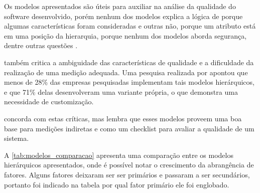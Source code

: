 \documentclass[
	12pt,				%
	openright,			%
	oneside,			%
	a4paper,			%
	english,			%
	brazil,				%
	]{abntex2}
\begin{document}
Os modelos apresentados são úteis para auxiliar na análise da qualidade do software desenvolvido, porém nenhum dos modelos explica a lógica de porque algumas características foram consideradas e outras não, porque um atributo está em uma posição da hierarquia, porque nenhum dos modelos aborda segurança, dentre outras questões \cite{PFLEEGER2010}.

 também critica a ambiguidade das características de qualidade e a dificuldade da realização de uma medição adequada. Uma pesquisa realizada por  apontou que menos de 28\% das empresas pesquisadas implementam tais modelos hierárquicos, e que 71\% delas desenvolveram uma variante própria, o que demonstra uma necessidade de customização.

 concorda com estas críticas, mas lembra que esses modelos proveem uma boa base para medições indiretas e como um checklist para avaliar a qualidade de um sistema.

A \autoref{tab:modelos_comparacao} apresenta uma comparação entre os modelos hierárquicos apresentados, onde é possível notar o crescimento da abrangência de fatores. Alguns fatores deixaram ser ser primários e passaram a ser secundários, portanto foi indicado na tabela por qual fator primário ele foi englobado.
\end{document}
